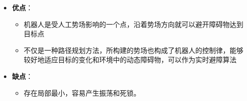 \documentclass[../main.tex]{subfiles}
\begin{document}
\begin{enumerate}
\begin{itemize}
            \item \textbf{优点}：
                \begin{itemize}
                    \item 机器人是受人工势场影响的一个点，沿着势场方向就可以避开障碍物达到目标点
                    \item 不仅是一种路径规划方法，所构建的势场也构成了机器人的控制律，能够较好地适应目标的变化和环境中的动态障碍物，可以作为实时避障算法
                \end{itemize}
            \item \textbf{缺点}：
                \begin{itemize}
                    \item 存在局部最小，容易产生振荡和死锁。
                \end{itemize}
        \end{itemize}

    
\end{enumerate}
\end{document}
